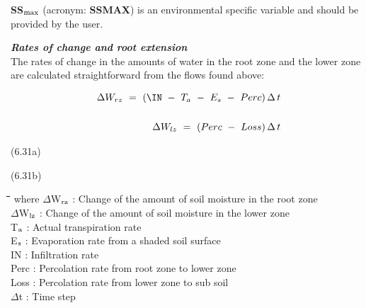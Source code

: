 \documentclass[11pt]{article}
\begin{document}
 \bigskip
{\bf SS$_{{\rm max}}$} (acronym: {\bf SSMAX}) is an environmental specific variable and should be provided
by the user.

\bigskip
\bigskip
{\bf {\it Rates of change and root extension\/}}\\
The rates of change in the amounts of water in the root zone and the lower zone are
calculated straightforward from the flows found above:

\begin{eqnarray*}
\Delta W _{rz} ~=~ (\IN ~-~ T _{a} ~-~ E _{s} ~-~ Perc)\,\Delta \, t  \nonumber  \\
~ \nonumber  \\
\Delta W _{lz} ~=~ (Perc ~-~ Loss)\,\Delta \, t
\end{eqnarray*}

 \bigskip
\strut\hfill (6.31a)

\strut\hfill (6.31b)
\nwln
\begin{tabbing}
\hspace{1.27cm}\=\hspace{1.27cm}\=\hspace{1.27cm}\=\hspace{1.27cm}\=%
\hspace{1.27cm}\=\hspace{1.27cm}\=\hspace{1.27cm}\=\hspace{1.27cm}\=%
\hspace{1.27cm}\=\hspace{1.27cm}\=\kill
where\> $\Delta$W$_{{\rm rz}}$\> : Change of the amount of soil moisture in the root zone\> \> \> \> \> \> \> \> [cm]\\
\>$\Delta$W$_{{\rm lz}}$\> : Change of the amount of soil moisture in the lower zone\> \> \> \> \> \> \> \> [cm]\\
\>T$_{{\rm a}}$\> : Actual transpiration rate \> \> \> \> \> \> \> \> [cm d$^{{\rm -1}}$]\\
\>E$_{{\rm s}}$\> : Evaporation rate from a shaded soil surface\> \> \> \> \> \> \> \> [cm d$^{{\rm -1}}$]\\
\>IN\> : Infiltration rate\> \> \> \> \> \> \> \> [cm d$^{{\rm -1}}$]\\
\>Perc\> : Percolation rate from root zone to lower zone\> \> \> \> \> \> \> \> [cm d$^{{\rm -1}}$]\\
\>Loss\> : Percolation rate from lower zone to sub soil\> \> \> \> \> \> \> \> [cm d$^{{\rm -1}}$]\\
\>$\Delta$t\> : Time step\> \> \> \> \> \> \> \> [d]
\end{tabbing}
\end{document}
